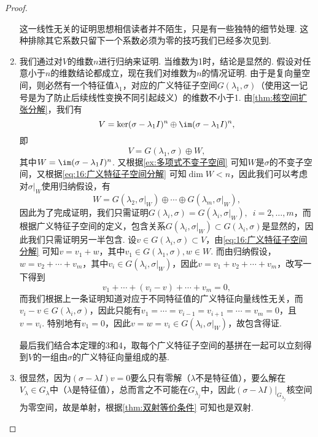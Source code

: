 \begin{proof}
\begin{enumerate}
              这一线性无关的证明思想相信读者并不陌生，只是有一些独特的细节处理. 这种排除其它系数只留下一个系数必须为零的技巧我们已经多次见到.

        \item 我们通过对$V$的维数$n$进行归纳来证明. 当维数为1时，结论是显然的. 假设对任意小于$n$的维数结论都成立，现在我们对维数为$n$的情况证明. 由于是复向量空间，则必然有一个特征值$\lambda_1$，对应的广义特征子空间$G(\lambda_1,\sigma)$（使用这一记号是为了防止后续线性变换不同引起歧义）的维数不小于1. 由\autoref{thm:核空间扩张分解}，我们有
              \[V=\ker(\sigma-\lambda_1 I)^n\oplus\im(\sigma-\lambda_1 I)^n,\]
              即
              \begin{equation} \label{eq:16:广义特征子空间分解}
                  V=G(\lambda_1,\sigma)\oplus W,
              \end{equation}
              其中$W=\im(\sigma-\lambda_1 I)^n$. 又根据\autoref{ex:多项式不变子空间} 可知$W$是$\sigma$的不变子空间，又根据\autoref{eq:16:广义特征子空间分解} 可知$\dim W<n$，因此我们可以考虑对$\sigma\vert_W$使用归纳假设，有
              \[W=G(\lambda_2,\sigma\vert_W)\oplus\cdots\oplus G(\lambda_m,\sigma\vert_W),\]
              因此为了完成证明，我们只需证明$G(\lambda_i,\sigma)=G(\lambda_i,\sigma\vert_W),\enspace i=2,\ldots,m$，而根据广义特征子空间的定义，包含关系$G(\lambda_i,\sigma\vert_W)\subset G(\lambda_i,\sigma)$是显然的，因此我们只需证明另一半包含. 设$v\in G(\lambda_i,\sigma)\subset V$，由\autoref{eq:16:广义特征子空间分解} 可知$v=v_1+w$，其中$v_1\in G(\lambda_1,\sigma),w\in W$. 而由归纳假设，$w=v_2+\cdots+v_m$，其中$v_i\in G(\lambda_i,\sigma\vert_W)$，因此$v=v_1+v_2+\cdots+v_m$，改写一下得到
              \[v_1+\cdots+(v_i-v)+\cdots+v_m=0,\]
              而我们根据上一条证明知道对应于不同特征值的广义特征向量线性无关，而$v_i-v\in G(\lambda_i,\sigma)$，因此只能有$v_1=\cdots=v_{i-1}=v_{i+1}=\cdots=v_m=0$，且$v=v_i$. 特别地有$v_1=0$，因此$v=w=v_i\in G(\lambda_i,\sigma\vert_W)$，故包含得证.

              最后我们结合本定理的3和4，取每个广义特征子空间的基拼在一起可以立刻得到$V$的一组由$\sigma$的广义特征向量组成的基.

        \item 很显然，因为$(\sigma-\lambda I)v=0$要么只有零解（$\lambda$不是特征值），要么解在$V_\lambda\in G_\lambda$中（$\lambda$是特征值），总而言之不可能在$G_{\lambda_j}$中，因此$(\sigma-\lambda I)\vert_{G_{\lambda_j}}$核空间为零空间，故是单射，根据\autoref{thm:双射等价条件} 可知也是双射.
    \end{enumerate}
\end{proof}

